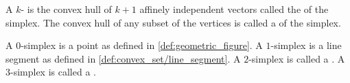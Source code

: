 \begin{definition}\label{def:simplex}
  A \( k \)- is the convex hull of \( k + 1 \) affinely independent vectors called the  of the simplex. The convex hull of any subset of the vertices is called a  of the simplex.

  \begin{defenum}
     A \( 0 \)-simplex is a point as defined in \cref{def:geometric_figure}.
     A \( 1 \)-simplex is a line segment as defined in \cref{def:convex_set/line_segment}.
     A \( 2 \)-simplex is called a .
     A \( 3 \)-simplex is called a .
  \end{defenum}
\end{definition}
